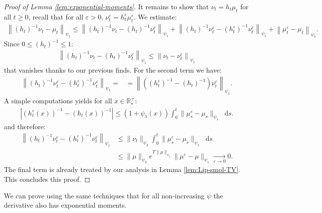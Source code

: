\documentclass[11pt,a4paper]{article}
\newcommand{\RRP}{\mathbb{R}^+_*}
\newcommand{\dd}{\mathop{}\!\mathrm{d}}
\begin{document}
\begin{proof}[Proof of Lemma \ref{lem:exponential-moments}]
    It remains to show that $\nu_t = h_t\mu_t$ for all $t \geq 0$, recall that for all $\varepsilon > 0$, $\nu^\varepsilon_t = h^\varepsilon_t\mu^\varepsilon_t$. We estimate:
    \begin{align*}
        \left\| (h_t)^{-1}\nu_t - \mu_t \right\|_{\psi_1} \leq \left\|(h_t)^{-1}\nu_t - (h_t)^{-1}\nu^\varepsilon_t\right\|_{\psi_1}  + \left\|(h_t)^{-1}\nu^\varepsilon_t - (h^\varepsilon_t)^{-1}\nu^\varepsilon_t\right\|_{\psi_1} + \left\|\mu^\varepsilon_t - \mu_t\right\|_{\psi_1}.
    \end{align*}
    Since $0 \leq (h_t)^{-1} \leq 1$:
    \begin{align*}
        \left\|(h_t)^{-1}\nu_t - (h_t)^{-1}\nu^\varepsilon_t\right\|_{\psi_1} \leq \left\|\nu_t - \nu^\varepsilon_t\right\|_{\psi_1} 
    \end{align*}
    that vanishes thanks to our previous finds. For the second term we have:
    \begin{align*}
        \left\|(h_t)^{-1}\nu^\varepsilon_t - (h^\varepsilon_t)^{-1}\nu^\varepsilon_t\right\|_{\psi_1} =
        &= \left\|((h^\varepsilon_t)^{-1} - (h_t)^{-1})\nu^\varepsilon_t\right\|_{\psi_1}.
    \end{align*}
    A simple computations yields for all $x \in \RRP$:
    \begin{align*}
        \left|\left( h^\varepsilon_t(x)\right)^{-1} - \left(h_t(x)\right)^{-1} \right| \leq (1 + \psi_1(x))\int_0^t \| \mu^\varepsilon_s - \mu_s \|_{\psi_1} \dd s .
    \end{align*}
    and therefore:
    \begin{align*}
        \left\|(h_t)^{-1}\nu^\varepsilon_t - (h^\varepsilon_t)^{-1}\nu^\varepsilon_t\right\|_{\psi_1} &\leq \|\nu_t\|_{\psi_2} \int_0^t \| \mu^\varepsilon_s - \mu_s \|_{\psi_1} \dd s \\
        &\leq  \|\mu\|_{\psi_2} e^{T\|\mu\|_{\psi_1}} \| \mu^\varepsilon - \mu \|_{\psi_1} \xrightarrow[\varepsilon \to 0]{} 0.
    \end{align*}
    The final term is already treated by our analysis in Lemma \ref{lem:Lip-smol-TV}. This concludes this proof.
\end{proof}
We can prove using the same techniques that for all non-increasing $\psi$ the derivative also has exponential moments.
\end{document}
